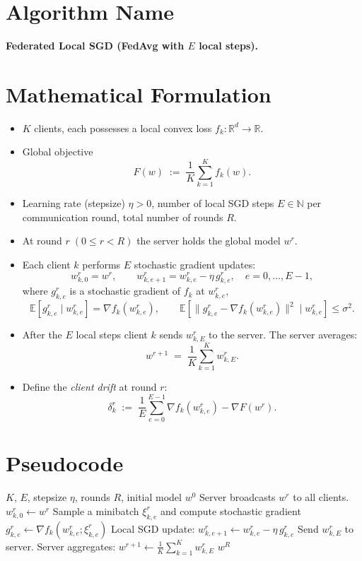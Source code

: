 \documentclass{article}
\newcommand{\E}{\mathbb{E}}
\begin{document}
\section*{Algorithm Name}
\textbf{Federated Local SGD (FedAvg with $E$ local steps).}

\section*{Mathematical Formulation}
\begin{itemize}
    \item $K$ clients, each possesses a local convex loss $f_k:\mathbb{R}^d\to\mathbb{R}$.
    \item Global objective 
    \[
        F(w)\;:=\;\frac1K\sum_{k=1}^{K}f_k(w).
    \]
    \item Learning rate (stepsize) $\eta>0$, number of local SGD steps $E\in\mathbb{N}$ per communication round, total number of rounds $R$.
    \item At round $r\;(0\le r<R)$ the server holds the global model $w^{r}$.
    \item Each client $k$ performs $E$ stochastic gradient updates:
    \[
        w_{k,0}^{r}=w^{r},
    \qquad 
    w_{k,e+1}^{r}=w_{k,e}^{r}-\eta\,g_{k,e}^{r},
    \quad e=0,\dots,E-1,
    \]
    where $g_{k,e}^{r}$ is a stochastic gradient of $f_k$ at $w_{k,e}^{r}$,
    \[
        \E\!\left[g_{k,e}^{r}\mid w_{k,e}^{r}\right]=\nabla f_k\!\left(w_{k,e}^{r}\right),\qquad
        \E\!\left[\|g_{k,e}^{r}-\nabla f_k(w_{k,e}^{r})\|^{2}\mid w_{k,e}^{r}\right]\le\sigma^{2}.
    \]
    \item After the $E$ local steps client $k$ sends $w_{k,E}^{r}$ to the server.  The server averages:
    \[
        w^{r+1}\;=\;\frac1K\sum_{k=1}^{K}w_{k,E}^{r}.
    \]
    \item Define the \emph{client drift} at round $r$:
    \[
        \delta_{k}^{r}\;:=\;\frac1E\sum_{e=0}^{E-1}\nabla f_k\!\left(w_{k,e}^{r}\right)-\nabla F\!\left(w^{r}\right).
    \]
\end{itemize}

\section*{Pseudocode}
\begin{algorithm}[H]
\caption{Federated Local SGD}
\begin{algorithmic}[1]
\REQUIRE $K$, $E$, stepsize $\eta$, rounds $R$, initial model $w^{0}$
    \STATE Server broadcasts $w^{r}$ to all clients.
        \STATE $w_{k,0}^{r}\gets w^{r}$
            \STATE Sample a minibatch $\xi_{k,e}^{r}$ and compute stochastic gradient 
            $g_{k,e}^{r}\gets\nabla f_k\!\left(w_{k,e}^{r};\xi_{k,e}^{r}\right)$
            \STATE Local SGD update: $w_{k,e+1}^{r}\gets w_{k,e}^{r}-\eta\,g_{k,e}^{r}$
        \ENDFOR
        \STATE Send $w_{k,E}^{r}$ to server.
    \ENDFOR
    \STATE Server aggregates: $w^{r+1}\gets \frac1K\sum_{k=1}^{K}w_{k,E}^{r}$
\ENDFOR
\RETURN $w^{R}$
\end{algorithmic}
\end{algorithm}
\end{document}
